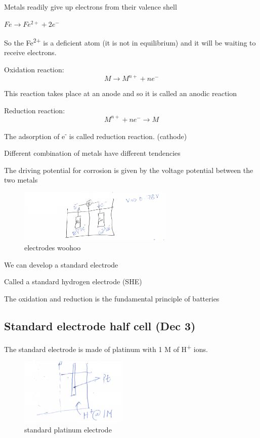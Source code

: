 \documentclass{article}
\begin{document}
Metals readily give up electrons from their valence shell

$Fe \rightarrow Fe^{2+} + 2e^{-}$

So the Fe\textsuperscript{2+} is a deficient atom (it is not in equilibrium) and it will be waiting to receive electrons. 

Oxidation reaction: 
\[M \rightarrow M^{n+} + ne^{-}\]

This reaction takes place at an anode and so it is called an anodic reaction

Reduction reaction: 
\[M^{n+} + ne^- \rightarrow M\]

The adsorption of e\textsuperscript{-} is called reduction reaction. (cathode)

Different combination of metals have different tendencies

The driving potential for corrosion is given by the voltage potential between the two metals

\begin{figure}[h!]
	\centering
	\includegraphics[width=0.66\textwidth]{assets/84bf8c79.png}
	\caption{electrodes woohoo}
\end{figure}

We can develop a standard electrode

Called a standard hydrogen electrode (SHE)

The oxidation and reduction is the fundamental principle of batteries

\subsection{Standard electrode half cell (Dec 3)}

The standard electrode is made of platinum with 1 M of H\textsuperscript{+} ions.

\begin{figure}[h!]
	\centering
	\includegraphics[width=0.46\textwidth]{assets/7b0c4229.png}
	\caption{standard platinum electrode}
\end{figure}
\end{document}
